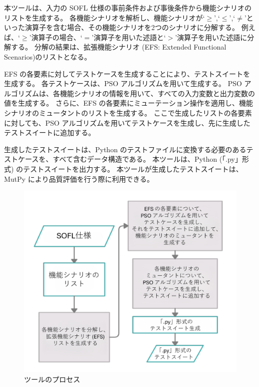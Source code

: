 \documentclass[uplatex, twocolumn, 10pt]{jsarticle} %
\begin{document}
本ツールは、入力の SOFL 仕様の事前条件および事後条件から機能シナリオのリストを生成する。
各機能シナリオを解析し、機能シナリオが`$\geq$',`$\leq$',`$\neq$'といった演算子を含む場合、その機能シナリオを2つのシナリオに分解する。
例えば、`$\geq$'演算子の場合、`$=$'演算子を用いた述語と`$>$'演算子を用いた述語に分解する。
分解の結果は、拡張機能シナリオ (EFS:  Extended Functional Scenarios)のリストとなる。

EFS の各要素に対してテストケースを生成することにより、テストスイートを生成する。
各テストケースは、PSO アルゴリズムを用いて生成する。
PSO アルゴリズムは、各機能シナリオの情報を用いて、すべての入力変数と出力変数の値を生成する。
さらに、EFS の各要素にミューテーション操作を適用し、機能シナリオのミュータントのリストを生成する。
ここで生成したリストの各要素に対しても、PSO アルゴリズムを用いてテストケースを生成し、先に生成したテストスイートに追加する。

生成したテストスイートは、Python のテストファイルに変換する必要のあるテストケースを、すべて含むデータ構造である。
本ツールは、Python (「.py」形式) のテストスイートを出力する。
本ツールが生成したテストスイートは、MutPy により品質評価を行う際に利用できる。

\begin{figure}[tp]
    \begin{center}
        \includegraphics[width=\linewidth]{../image/Automatic_Generation_of_Test/tool_process.png}
        \caption{ツールのプロセス}
        \label{fig:tool_process}
    \end{center}
\end{figure}
\end{document}
